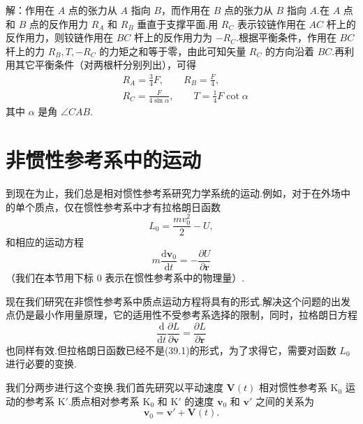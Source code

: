 \begin{xiti}
解：作用在 $A$ 点的张力从 $A$ 指向 $B$，而作用在 $B$ 点的张力从 $B$ 指向 $A$.在 $A$ 点和 $B$ 点的反作用力 $R_A$ 和 $R_B$ 垂直于支撑平面.用 $R_C$ 表示铰链作用在 $AC$ 杆上的反作用力，则铰链作用在 $BC$ 杆上的反作用力为 $-R_C$.根据平衡条件，作用在 $BC$ 杆上的力 $R_B,T,-R_C$ 的力矩之和等于零，由此可知矢量 $R_C$ 的方向沿着 $BC$.再利用其它平衡条件（对两根杆分别列出），可得
\begin{equation*}
\begin{aligned}
  &R_A=\frac{3}{4}F,\qquad R_B=\frac{F}{4},\\
  &R_C=\frac{F}{4\sin\alpha},\qquad
  T=\frac{1}{4}F\cot\alpha
\end{aligned}
\end{equation*}
其中 $\alpha$ 是角 $\angle CAB$.

\end{xiti}

\section{非惯性参考系中的运动}

到现在为止，我们总是相对惯性参考系研究力学系统的运动.例如，对于在外场中的单个质点，仅在惯性参考系中才有拉格朗日函数
\begin{equation}
  L_0=\frac{m v_0^2}{2}-U,
\end{equation}
和相应的运动方程
\begin{equation*}
  m\frac{\mathrm{d}\boldsymbol{v}_0}{\mathrm{d}t}
  =-\frac{\partial U}{\partial\boldsymbol{r}}
\end{equation*}
（我们在本节用下标 0 表示在惯性参考系中的物理量）.

现在我们研究在非惯性参考系中质点运动方程将具有的形式.解决这个问题的出发点仍是最小作用量原理，它的适用性不受参考系选择的限制，同时，拉格朗日方程
\begin{equation}
  \frac{\mathrm{d}}{\mathrm{d}t}\frac{\partial L}{\partial\boldsymbol{v}}
  =\frac{\partial L}{\partial\boldsymbol{r}}
\end{equation}
也同样有效.但拉格朗日函数已经不是(39.1)的形式，为了求得它，需要对函数 $L_0$ 进行必要的变换.

我们分两步进行这个变换.我们首先研究以平动速度 $\boldsymbol{V}(t)$ 相对惯性参考系 $\mathrm{K}_0$ 运动的参考系 $\mathrm{K}'$.质点相对参考系 $\mathrm{K}_0$ 和 $\mathrm{K}'$ 的速度 $\boldsymbol{v}_0$ 和 $\boldsymbol{v}'$ 之间的关系为
\begin{equation}
  \boldsymbol{v}_0=\boldsymbol{v}'+\boldsymbol{V}(t).
\end{equation}

